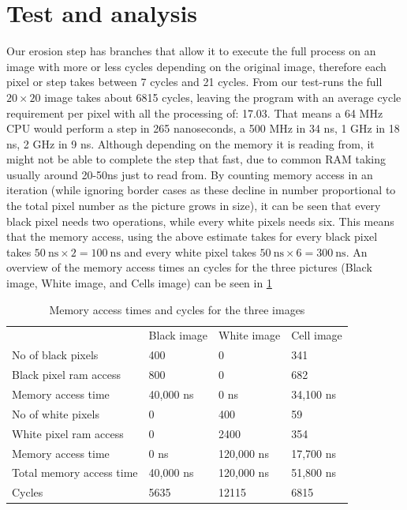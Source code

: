 \documentclass[a4paper, english]{article}
\numberwithin{equation}{section}
\begin{document}
\section{Test and analysis}\label{sec:test}
Our erosion step has branches that allow it to execute the full process on an image with more or less cycles depending on the original image, therefore each pixel or step takes between 7 cycles and 21 cycles. From our test-runs the full \(20 \times 20\) image takes about 6815 cycles, leaving the program with an average cycle requirement per pixel with all the processing of: 17.03. That means a 64 MHz CPU would perform a step in 265 nanoseconds, a 500 MHz in 34 ns, 1 GHz in 18 ns, 2 GHz in 9 ns. Although depending on the memory it is reading from, it might not be able to complete the step that fast, due to common RAM taking usually around 20-50ns just to read from.\newline
By counting memory access in an iteration (while ignoring border cases as these decline in number proportional to the total pixel number as the picture grows in size), it can be seen that every black pixel needs two operations, while every white pixels needs six. This means that the memory access, using the above estimate takes for every black pixel takes \(\SI{50}{\nano\second} \times 2 = \SI{100}{\nano\second}\) and every white pixel takes \(\SI{50}{\nano\second} \times 6 = \SI{300}{\nano\second}\). An overview of the memory access times an cycles for the three pictures (Black image, White image, and Cells image) can be seen in \cref{tbl:memacccycl}
\begin{table}[H]
    \centering
    \caption{Memory access times and cycles for the three images}\label{tbl:memacccycl}
    \begin{tabular}{llll}
        \toprule
                                 & Black image & White image & Cell image \\
        No of black pixels       & 400         & 0           & 341        \\
        Black pixel ram access   & 800         & 0           & 682        \\
        Memory access time       & 40,000 ns   & 0 ns        & 34,100 ns  \\
        \midrule
        No of white pixels       & 0           & 400         & 59         \\
        White pixel ram access   & 0           & 2400        & 354        \\
        Memory access time       & 0 ns        & 120,000 ns  & 17,700 ns  \\
        \midrule
        Total memory access time & 40,000 ns   & 120,000 ns  & 51,800 ns  \\
        Cycles                   & 5635        & 12115       & 6815       \\
        \bottomrule
    \end{tabular}
\end{table}
\end{document}
